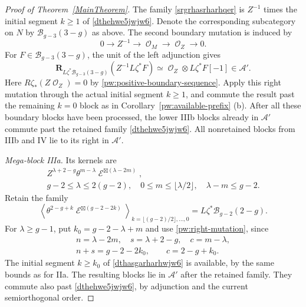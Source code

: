 \documentclass[11pt,letterpaper]{amsart}
\theoremstyle{plain}
\theoremstyle{definition}
\theoremstyle{remark}
\numberwithin{equation}{section}
\DeclareMathOperator{\cE}{\mathcal{E}}
\DeclareMathOperator{\cO}{\mathcal{O}}
\begin{document}
\begin{proof}[Proof of Theorem~\ref{MainTheorem}]
The family \eqref{srgrhasrharhqer} is $Z^{-1}$ times the initial
segment $k\geq1$ of \eqref{dthehwe5jwjw6}.  Denote the corresponding
subcategory on $N$ by $\mathcal B_{g-3}(3-g)$ as above.  The second
boundary mutation is  induced by
\begin{equation}\label{pw:negative-boundary-sequence}
 0\longrightarrow Z^{-1}\longrightarrow\cO_M
       \longrightarrow\cO_Z\longrightarrow0.
\end{equation}
For $F\in\mathcal B_{g-3}(3-g)$, the unit of the left adjunction
gives
\begin{equation}\label{pw:negative-boundary-mutation}
 \mathbf R_{L\zeta^*\mathcal B_{g-3}(3-g)}(Z^{-1}L\zeta^*F)
       \simeq\cO_Z\otimes L\zeta^*F[-1]\in\mathcal A'.
\end{equation}
Here $R\zeta_*(Z\cO_Z)=0$ by
\eqref{pw:positive-boundary-sequence}.  Apply this right mutation
through the actual initial segment $k\geq1$, and commute the result
past the remaining $k=0$ block as in
Corollary~\ref{pw:available-prefix} (b).  After all these boundary blocks
have been processed, the lower IIIb blocks already in $\mathcal A'$
commute past the retained family \eqref{dthehwe5jwjw6}.  All
nonretained blocks from IIIb and IV lie to its right in $\mathcal A'$.

\smallskip
\noindent\textit{Mega-block IIIa.}
Its kernels are
\[
 \begin{gathered}
 Z^{\lambda+2-g}\theta^{m-\lambda}
       \cE^{\boxtimes(\lambda-2m)},\\
 g-2\leq\lambda\leq2(g-2),\quad
 0\leq m\leq\lfloor\lambda/2\rfloor,\quad\lambda-m\leq g-2.
 \end{gathered}
\]
Retain the  family
\begin{equation}\label{dthasgarharhwjw6}
 \left\langle\theta^{2-g+k}\cE^{\boxtimes(g-2-2k)}
 \right\rangle_{k=\lfloor(g-2)/2\rfloor,\ldots,0}
       =L\zeta^*\mathcal B_{g-2}(2-g).
\end{equation}
For $\lambda\geq g-1$, put $k_0=g-2-\lambda+m$ and use
\eqref{pw:right-mutation}, since
\[
 \begin{gathered}
 n=\lambda-2m,\quad s=\lambda+2-g,\quad c=m-\lambda,\\
 n+s=g-2-2k_0,\qquad c=2-g+k_0.
 \end{gathered}
\]
The initial segment $k\geq k_0$ of
\eqref{dthasgarharhwjw6} is available, by the same bounds as for IIa.
The resulting blocks lie in $\mathcal A'$ after the retained family.
They commute also past \eqref{dthehwe5jwjw6}, by adjunction and the
current semiorthogonal order.  


\end{proof}
\end{document}
